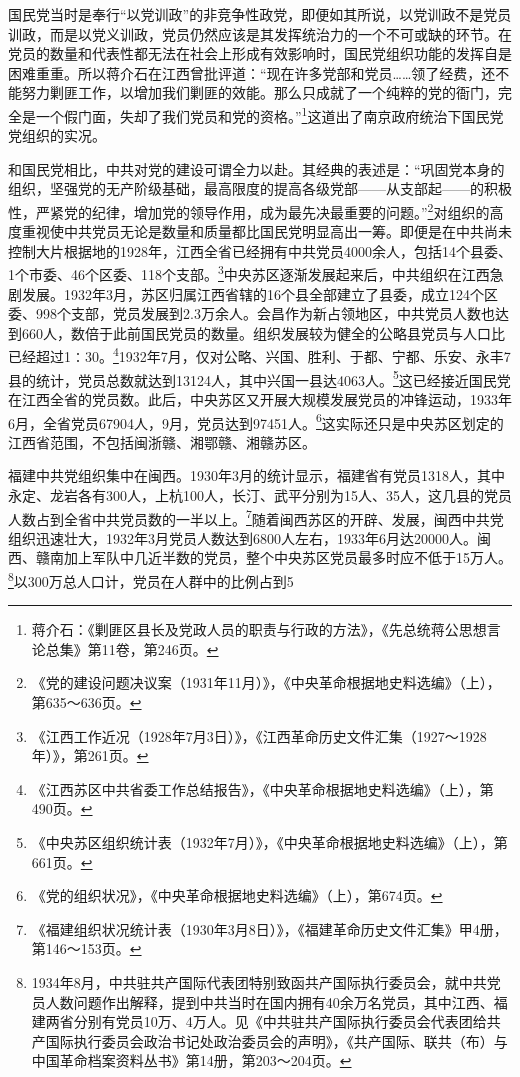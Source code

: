 国民党当时是奉行“以党训政”的非竞争性政党，即便如其所说，以党训政不是党员训政，而是以党义训政，党员仍然应该是其发挥统治力的一个不可或缺的环节。在党员的数量和代表性都无法在社会上形成有效影响时，国民党组织功能的发挥自是困难重重。所以蒋介石在江西曾批评道：“现在许多党部和党员……领了经费，还不能努力剿匪工作，以增加我们剿匪的效能。那么只成就了一个纯粹的党的衙门，完全是一个假门面，失却了我们党员和党的资格。”\footnote{蒋介石：《剿匪区县长及党政人员的职责与行政的方法》，《先总统蒋公思想言论总集》第11卷，第246页。}这道出了南京政府统治下国民党党组织的实况。


和国民党相比，中共对党的建设可谓全力以赴。其经典的表述是：“巩固党本身的组织，坚强党的无产阶级基础，最高限度的提高各级党部——从支部起——的积极性，严紧党的纪律，增加党的领导作用，成为最先决最重要的问题。”\footnote{《党的建设问题决议案（1931年11月）》，《中央革命根据地史料选编》（上），第635～636页。}对组织的高度重视使中共党员无论是数量和质量都比国民党明显高出一筹。即便是在中共尚未控制大片根据地的1928年，江西全省已经拥有中共党员4000余人，包括14个县委、1个市委、46个区委、118个支部。\footnote{《江西工作近况（1928年7月3日）》，《江西革命历史文件汇集（1927～1928年）》，第261页。}中央苏区逐渐发展起来后，中共组织在江西急剧发展。1932年3月，苏区归属江西省辖的16个县全部建立了县委，成立124个区委、998个支部，党员发展到2.3万余人。会昌作为新占领地区，中共党员人数也达到660人，数倍于此前国民党员的数量。组织发展较为健全的公略县党员与人口比已经超过1∶30。\footnote{《江西苏区中共省委工作总结报告》，《中央革命根据地史料选编》（上），第490页。}1932年7月，仅对公略、兴国、胜利、于都、宁都、乐安、永丰7县的统计，党员总数就达到13124人，其中兴国一县达4063人。\footnote{《中央苏区组织统计表（1932年7月）》，《中央革命根据地史料选编》（上），第661页。}这已经接近国民党在江西全省的党员数。此后，中央苏区又开展大规模发展党员的冲锋运动，1933年6月，全省党员67904人，9月，党员达到97451人。\footnote{《党的组织状况》，《中央革命根据地史料选编》（上），第674页。}这实际还只是中央苏区划定的江西省范围，不包括闽浙赣、湘鄂赣、湘赣苏区。


福建中共党组织集中在闽西。1930年3月的统计显示，福建省有党员1318人，其中永定、龙岩各有300人，上杭100人，长汀、武平分别为15人、35人，这几县的党员人数占到全省中共党员数的一半以上。\footnote{《福建组织状况统计表（1930年3月8日）》，《福建革命历史文件汇集》甲4册，第146～153页。}随着闽西苏区的开辟、发展，闽西中共党组织迅速壮大，1932年3月党员人数达到6800人左右，1933年6月达20000人。闽西、赣南加上军队中几近半数的党员，整个中央苏区党员最多时应不低于15万人。\footnote{1934年8月，中共驻共产国际代表团特别致函共产国际执行委员会，就中共党员人数问题作出解释，提到中共当时在国内拥有40余万名党员，其中江西、福建两省分别有党员10万、4万人。见《中共驻共产国际执行委员会代表团给共产国际执行委员会政治书记处政治委员会的声明》，《共产国际、联共（布）与中国革命档案资料丛书》第14册，第203～204页。}以300万总人口计，党员在人群中的比例占到5%


